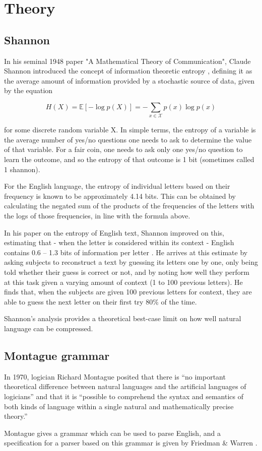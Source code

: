\section{Theory}
\label{sec:theory}

\subsection{Shannon}
\label{subsec:shannon}

In his seminal 1948 paper "A Mathematical Theory of Communication", Claude Shannon introduced the concept of information theoretic entropy \autocite{shannon1948mathematical}, defining it as the average amount of information provided by a stochastic source of data, given by the equation

\[H(X) = \mathbb{E}[-\log p(X)] = -\sum_{x \in \mathcal{X}} p(x) \log p(x)\]

for some discrete random variable X. In simple terms, the entropy of a variable is the average number of yes/no questions one needs to ask to determine the value of that variable. For a fair coin, one needs to ask only one yes/no question to learn the outcome, and so the entropy of that outcome is 1 bit (sometimes called 1 shannon).

For the English language, the entropy of individual letters based on their frequency is known to be approximately 4.14 bits. This can be obtained by calculating the negated sum of the products of the frequencies of the letters with the logs of those frequencies, in line with the formula above.

In his paper on the entropy of English text, Shannon improved on this, estimating that - when the letter is considered within its context - English contains 0.6 – 1.3 bits of information per letter \autocite{Shannon1951}. He arrives at this estimate by asking subjects to reconstruct a text by guessing its letters one by one, only being told whether their guess is correct or not, and by noting how well they perform at this task given a varying amount of context (1 to 100 previous letters). He finds that, when the subjects are given 100 previous letters for context, they are able to guess the next letter on their first try 80\% of the time. 

Shannon's analysis provides a theoretical best-case limit on how well natural language can be compressed. 

\subsection{Montague grammar}
In 1970, logician Richard Montague posited that there is “no important theoretical difference between natural languages and the artificial languages of logicians” and that it is “possible to comprehend the syntax and semantics of both kinds of language within a single natural and mathematically precise theory.” \autocite{Montague1970}

Montague gives a grammar which can be used to parse English, and a specification for a parser based on this grammar is given by Friedman \& Warren \autocite{Friedman1978}.